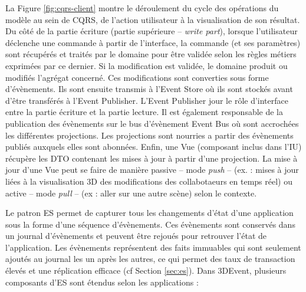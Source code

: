 La Figure \ref{fig:cqrs-client} montre le déroulement du cycle des opérations du 
modèle au sein de \gls{CQRS}, de l'action utilisateur à la visualisation de son 
résultat. 
Du côté de la partie écriture (partie supérieure -- \textit{write part}), lorsque 
l'utilisateur déclenche une commande à partir de l'interface, la commande (et ses 
paramètres) sont récupérés et traités par le domaine pour être validée selon les 
règles métiers exprimées par ce dernier. Si la modification est validée, le domaine 
produit ou modifiés l'agrégat concerné. Ces modifications sont converties sous 
forme d'évènements. Ils sont ensuite transmis à l'Event Store où ils sont stockés 
avant d'être transférés à l'Event Publisher. L'Event Publisher jour le rôle d'interface 
entre la partie écriture et la partie lecture. Il est également responsable de la 
publication des évènements sur le bus d'évènement Event Bus où sont 
accrochées les différentes projections. Les projections sont nourries a partir des 
évènements publiés auxquels elles sont abonnées. Enfin, une Vue (composant
inclus dans l'\gls{IU}) récupère les DTO 
contenant les mises à jour à partir d'une projection. La mise à jour d'une Vue peut 
se faire de manière passive -- mode \textit{push} -- (ex. : mises à jour liées à la 
visualisation 3D des modifications des collabotaeurs en temps réel) ou active -- 
mode \textit{pull} -- (ex : aller sur une autre scène) selon le contexte.


Le patron \gls{ES} permet de capturer tous les changements d'état 
d'une application sous la forme d'une séquence d'évènements. 
Ces évènements sont conservés dans un journal d'évènements et peuvent être 
rejoués pour retrouver l'état de l'application. 
Les évènements représentent des faits immuables qui sont 
seulement ajoutés au journal les un après les autres, ce qui permet des taux de 
transaction élevés et une réplication efficace (cf Section 
\ref{sec:es}). Dans 3DEvent, plusieurs composants d'\gls{ES} sont étendus selon 
les applications :

